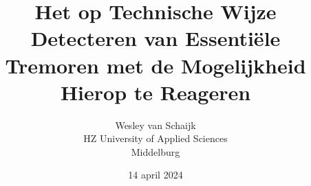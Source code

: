 \documentclass{article}
\title{Het op Technische Wijze Detecteren van Essentiële Tremoren met de Mogelijkheid Hierop te Reageren}
\author{Wesley van Schaijk \\ HZ University of Applied Sciences \\ Middelburg}
\date{14 april 2024}
\begin{document}
\maketitle




\newpage
\begin{multicols}{2}
    
    
    
    
    
    
    
\end{multicols}

{
    \raggedright
    
    
}

\newpage

\end{document}
